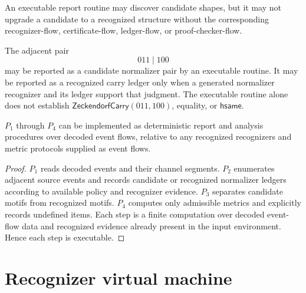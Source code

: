 \begin{principle}
\label{prin:programmatic-programs-do-not-upgrade-candidates}
An executable report routine may discover candidate shapes, but it may not upgrade a candidate to a recognized structure without the corresponding recognizer-flow, certificate-flow, ledger-flow, or proof-checker-flow.
\end{principle}

\begin{example}
\label{ex:programmatic-candidate-pair-boundary}
The adjacent pair
$$
  011\mid 100
$$
may be reported as a candidate normalizer pair by an executable routine. It may be reported as a recognized carry ledger only when a generated normalizer recognizer and its ledger support that judgment. The executable routine alone does not establish $\mathsf{ZeckendorfCarry}(011,100)$, equality, or $\mathsf{hsame}$.
\end{example}

\begin{proposition}
\label{prop:programmatic-p1-p4-executable}
$P_1$ through $P_4$ can be implemented as deterministic report and analysis procedures over decoded event flows, relative to any recognized recognizers and metric protocols supplied as event flows.
\end{proposition}

\begin{proof}
$P_1$ reads decoded events and their channel segments. $P_2$ enumerates adjacent source events and records candidate or recognized normalizer ledgers according to available policy and recognizer evidence. $P_3$ separates candidate motifs from recognized motifs. $P_4$ computes only admissible metrics and explicitly records undefined items. Each step is a finite computation over decoded event-flow data and recognized evidence already present in the input environment. Hence each step is executable.
\end{proof}

\section{Recognizer virtual machine}
\label{sec:programmatic-recognizer-vm}

